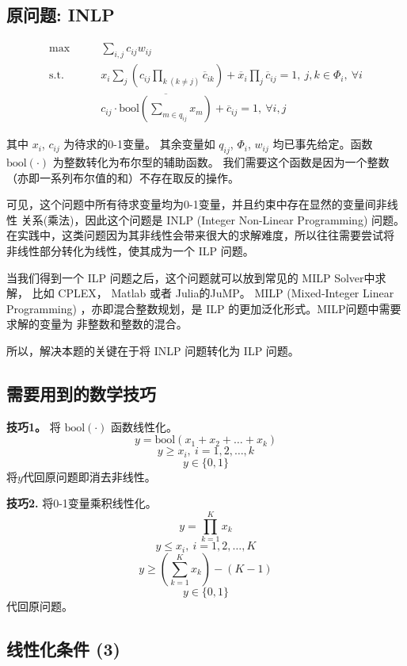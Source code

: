 \documentclass[onecolumn,times]{article}
\begin{document}
\begin{CJK}{UTF8}{gkai}

\section{原问题: INLP}

\begin{align}
	\max\qquad & \sum_{i,j} c_{ij} w_{ij} \\
	\text{s.t.}\qquad & x_i \sum_j (c_{ij}\prod_{k~(k\neq j)} \overline{c}_{ik} )
	+ \overline{x}_i \prod_j \overline{c}_{ij} = 1,~ j,k\in \Phi_i,~ \forall i\\
	& c_{ij} \cdot \overline{\text{bool}(\sum_{m\in q_{ij}} x_m)} 
	+ \overline{c}_{ij} = 1
	,~ \forall i,j
\end{align}

其中 $x_i$, $c_{ij}$ 为待求的0-1变量。
其余变量如 $q_{ij}$, $\Phi_i$, $w_{ij}$
均已事先给定。函数$\text{bool}(\cdot)$ 为整数转化为布尔型的辅助函数。
我们需要这个函数是因为一个整数（亦即一系列布尔值的和）不存在取反的操作。

可见，这个问题中所有待求变量均为0-1变量，并且约束中存在显然的变量间非线性
关系(乘法)，因此这个问题是 INLP (Integer Non-Linear Programming) 问题。
在实践中，这类问题因为其非线性会带来很大的求解难度，所以往往需要尝试将
非线性部分转化为线性，使其成为一个 ILP 问题。

当我们得到一个 ILP 问题之后，这个问题就可以放到常见的 MILP Solver中求解，
	比如 CPLEX， Matlab 或者 Julia的JuMP。 MILP (Mixed-Integer Linear Programming)
，亦即混合整数规划，是 ILP 的更加泛化形式。MILP问题中需要求解的变量为
非整数和整数的混合。

所以，解决本题的关键在于将 INLP 问题转化为 ILP 问题。

\subsection{需要用到的数学技巧}

\textbf{技巧1。} 将 $\text{bool}(\cdot)$ 函数线性化。
$$y=\text{bool}(x_1 + x_2 + \ldots + x_k)$$
	$$y\geq x_i,~ i=1,2,\ldots,k$$
$$y\in\{0,1\}$$
	将$y$代回原问题即消去非线性。

\textbf{技巧2.} 将0-1变量乘积线性化。
$$y=\prod_{k=1}^{K} x_k$$
	$$y\leq x_i,~ i=1,2,\ldots,K$$
$$y\geq (\sum_{k=1}^{K} x_k) - (K - 1)$$
$$y\in\{0,1\}$$
代回原问题。

\subsection{线性化条件 (3)}


\end{CJK}
\end{document}
